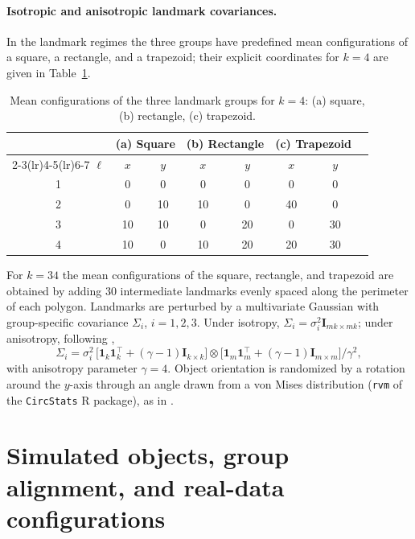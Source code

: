 \documentclass[11pt,a4paper]{article}
\newcommand{\bI}{\mathbf{I}}
\newcommand{\bone}{\mathbf{1}}
\begin{document}
\paragraph{Isotropic and anisotropic landmark covariances.} In the
landmark regimes the three groups have predefined mean configurations of
a square, a rectangle, and a trapezoid; their explicit coordinates for
$k=4$ are given in Table~\ref{tab:mean-configs}.

\begin{table}[t]
\centering
\caption{Mean configurations of the three landmark groups for $k=4$:
  (a) square, (b) rectangle, (c) trapezoid.}
\label{tab:mean-configs}
\small
\begin{tabular}{cc cc cc cc}
\toprule
& \multicolumn{2}{c}{(a) Square}
& \multicolumn{2}{c}{(b) Rectangle}
& \multicolumn{2}{c}{(c) Trapezoid} \\
\cmidrule(lr){2-3}\cmidrule(lr){4-5}\cmidrule(lr){6-7}
$\ell$ & $x$ & $y$ & $x$ & $y$ & $x$ & $y$ \\
\midrule
1 & 0  & 0  & 0  & 0  & 0  & 0  \\
2 & 0  & 10 & 10 & 0  & 40 & 0  \\
3 & 10 & 10 & 0  & 20 & 0  & 30 \\
4 & 10 & 0  & 10 & 20 & 20 & 30 \\
\bottomrule
\end{tabular}
\end{table}

For $k=34$ the mean configurations of the square, rectangle, and
trapezoid are obtained by adding $30$ intermediate landmarks evenly
spaced along the perimeter of each polygon. Landmarks are perturbed by
a multivariate Gaussian with group-specific covariance $\Sigma_i$,
$i=1,2,3$. Under isotropy, $\Sigma_i=\sigma_i^2 \bI_{mk\times mk}$; under
anisotropy, following \citet{preston2010two},
\begin{equation}
  \label{eq:aniso}
  \Sigma_i = \sigma_i^2\,\bigl[\bone_{k}\bone_{k}^\top
   + (\gamma-1)\bI_{k\times k}\bigr] \otimes
   \bigl[\bone_{m}\bone_{m}^\top + (\gamma-1)\bI_{m\times m}\bigr]
   / \gamma^2,
\end{equation}
with anisotropy parameter $\gamma=4$. Object orientation is randomized
by a rotation around the $y$-axis through an angle drawn from a von
Mises distribution (\texttt{rvm} of the \texttt{CircStats} R package),
as in \citet{vinue2016means}.


\section{Simulated objects, group alignment, and real-data configurations}
\label{sec:objects}
\end{document}
